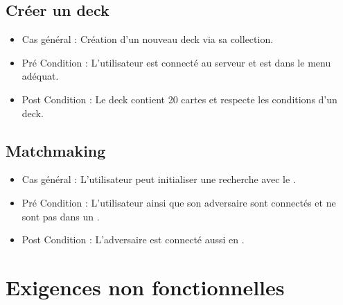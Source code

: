 \subsection{Créer un deck}
\begin{itemize}
    \item Cas général : Création d'un nouveau deck via sa collection.
    \item Pré Condition  : L'utilisateur est connecté au serveur et est dans le menu adéquat.
    \item Post Condition : Le deck contient 20 cartes et respecte les conditions d'un deck.
\end{itemize}

\subsection{Matchmaking}
\begin{itemize}
    \item Cas général : L'utilisateur peut initialiser une recherche avec le .
    \item Pré Condition  : L'utilisateur ainsi que son adversaire sont connectés et ne sont pas dans un .
    \item Post Condition : L'adversaire est connecté aussi en .
\end{itemize}

\section{Exigences non fonctionnelles}

